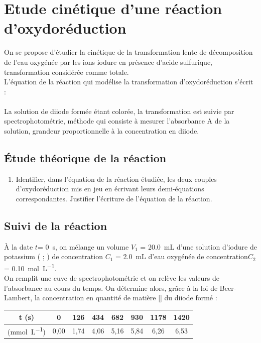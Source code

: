 \documentclass[a4paper,11pt,fleqn]{article}%
\begin{document}
	\maketitle

\section{Etude cinétique d’une réaction d’oxydoréduction}
On se propose d’étudier la cinétique de la transformation lente de décomposition de l’eau oxygénée par les ions iodure en présence d’acide sulfurique, transformation considérée comme totale.\\
L’équation de la réaction qui modélise la transformation d’oxydoréduction s’écrit :
\\
\\

La solution de diiode formée étant colorée, la transformation est suivie par spectrophotométrie, méthode qui consiste  à mesurer l'absorbance A de la solution, grandeur proportionnelle à la concentration en diiode.

	\subsection{Étude théorique de la réaction}
	\begin{enumerate}
		\item Identifier,  dans l'équation de la réaction étudiée, les deux couples d'oxydoréduction mis en jeu en écrivant leurs demi-équations correspondantes.
		Justifier l’écriture de l’équation de la réaction.
	\end{enumerate}
	\subsection{Suivi de la réaction}
	À la date $t$= \SI{0}{s}, on mélange un volume $V_1$ = \SI{20,0}{mL} d'une solution d'iodure de potassium ( ; ) de concentration $C_1$ = \SI{2,0}{mL} d'eau oxygénée  de concentration$C_2$ = \SI{0,10}{\mole\per\liter}.\\
	On remplit une cuve de spectrophotométrie et on relève les valeurs de l'absorbance au cours du temps. On détermine alors, grâce à la loi de Beer-Lambert, la concentration en quantité de matière  [] du diiode formé :\\
	\begin{tabular}{|c|c|c|c|c|c|c|c|}
		\hline t (s)& 0 & 126 & 434 & 682 & 930 & 1178 & 1420\\
		\hline [\ce{I2}] (\unit{\milli\mole\per\liter}) & 0,00 & 1,74 & 4,06 & 5,16 & 5,84 & 6,26 & 6,53\\
		\hline
	\end{tabular}
	
\end{document}
